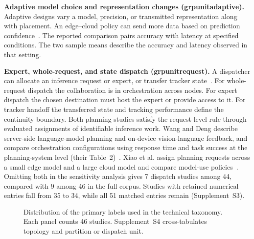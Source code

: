 \documentclass[journal]{IEEEtran}
\newcommand{\groupcite}[2]{\csname grp#1#2\endcsname}
\begin{document}
\textbf{Adaptive model choice and representation changes (\groupcite{unit}{adaptive}).}
Adaptive designs vary a model, precision, or transmitted representation along with placement. An edge--cloud policy can send more data based on prediction confidence~\cite{R0080}. The reported comparison pairs accuracy with latency at specified conditions. The two sample means describe the accuracy and latency observed in that setting.

\textbf{Expert, whole-request, and state dispatch (\groupcite{unit}{request}).}
A dispatcher can allocate an inference request or expert, or transfer tracker state~\cite{R0058,R0118,R0292}. For whole-request dispatch the collaboration is in orchestration across nodes. For expert dispatch the chosen destination must host the expert or provide access to it. For tracker handoff the transferred state and tracking performance define the continuity boundary. Both planning studies satisfy the request-level rule through evaluated assignments of identifiable inference work. Wang and Deng describe server-side language-model planning and on-device vision-language feedback, and compare orchestration configurations using response time and task success at the planning-system level (their Table~2)~\cite{R0223}. Xiao et al. assign planning requests across a small edge model and a large cloud model and compare model-use policies~\cite{R0145}. Omitting both in the sensitivity analysis gives 7 dispatch studies among 44, compared with 9 among 46 in the full corpus. Studies with retained numerical entries fall from 35 to 34, while all 51 matched entries remain (Supplement~S3).

\begin{figure}[!tp]
\centering

\caption{Distribution of the primary labels used in the technical taxonomy. Each panel counts 46 studies. Supplement~S4 cross-tabulates topology and partition or dispatch unit.}\label{fig:taxonomy}
\end{figure}
\end{document}

